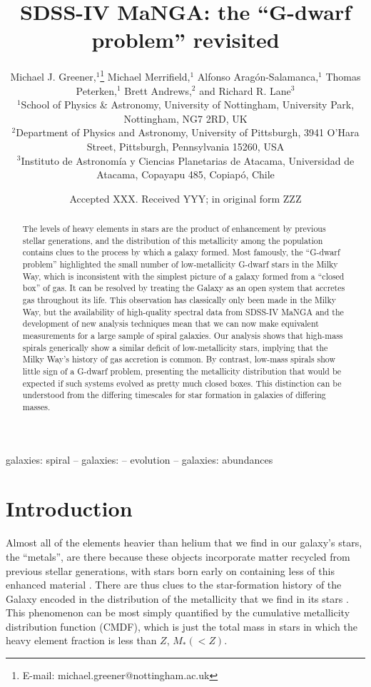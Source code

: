 \documentclass[fleqn,usenatbib]{mnras}
\title[The G-dwarf problem revisited]{SDSS-IV MaNGA: the ``G-dwarf problem'' revisited}
\author[M. J. Greener et al.]{
Michael J. Greener,$^{1}$\thanks{E-mail: michael.greener@nottingham.ac.uk}
Michael Merrifield,$^{1}$
Alfonso Arag{\'o}n-Salamanca,$^{1}$
Thomas Peterken,$^{1}$
\newauthor
Brett Andrews,$^{2}$
and Richard R. Lane$^{3}$
\\
$^{1}$School of Physics \& Astronomy, University of Nottingham, University Park, Nottingham, NG7 2RD, UK\\
$^{2}$Department of Physics and Astronomy, University of Pittsburgh, 3941 O'Hara Street, Pittsburgh, Pennsylvania 15260, USA\\
$^{3}$Instituto de Astronom{\'i}a y Ciencias Planetarias de Atacama, Universidad de Atacama, Copayapu 485, Copiap{\'o}, Chile\\
}
\date{Accepted XXX. Received YYY; in original form ZZZ}
\begin{document}
\label{firstpage}
\pagerange{\pageref{firstpage}--\pageref{lastpage}}
\maketitle

\begin{abstract}
The levels of heavy elements in stars are the product of enhancement by previous stellar generations, and the distribution of this metallicity among the population contains clues to the process by which a galaxy formed. Most famously, the ``G-dwarf problem'' highlighted the small number of low-metallicity G-dwarf stars in the Milky Way, which is inconsistent with the simplest picture of a galaxy formed from a ``closed box'' of gas. It can be resolved by treating the Galaxy as an open system that accretes gas throughout its life. This observation has classically only been made in the Milky Way, but the availability of high-quality spectral data from SDSS-IV MaNGA and the development of new analysis techniques mean that we can now make equivalent measurements for a large sample of spiral galaxies. Our analysis shows that high-mass spirals generically show a similar deficit of low-metallicity stars, implying that the Milky Way's history of gas accretion is common. By contrast, low-mass spirals show little sign of a G-dwarf problem, presenting the metallicity distribution that would be expected if such systems evolved as pretty much closed boxes. This distinction can be understood from the differing timescales for star formation in galaxies of differing masses.

\end{abstract}

\begin{keywords}
galaxies: spiral -- galaxies: -- evolution -- galaxies: abundances
\end{keywords}



\section{Introduction}
\label{sec:Introduction}

Almost all of the elements heavier than helium that we find in our galaxy's stars, the ``metals'', are there because these objects incorporate matter recycled from previous stellar generations, with stars born early on containing less of this enhanced material \citep{Schmidt1963TheMass., Talbot1971TheModel, Tinsley1980EvolutionGalaxies}. There are thus clues to the star-formation history of the Galaxy encoded in the distribution of the metallicity that we find in its stars \citep{Talbot1971TheModel}. This phenomenon can be most simply quantified by the cumulative metallicity distribution function (CMDF), which is just the total mass in stars in which the heavy element fraction is less than $Z$, $M_*(<Z)$.
\end{document}

